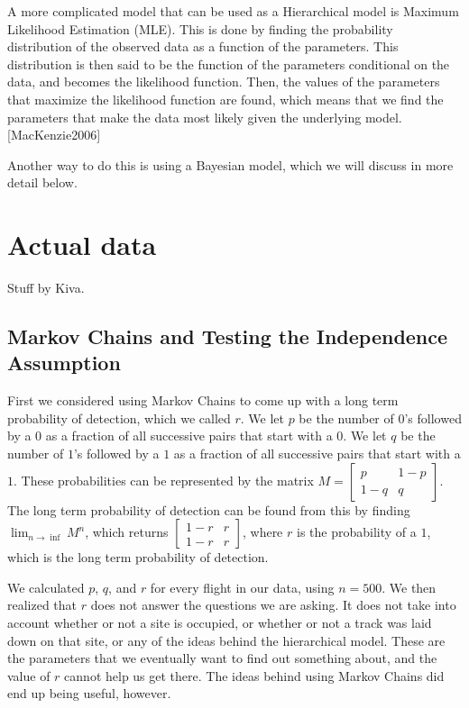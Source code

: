 \documentclass{article}
\begin{document}
	A more complicated model that can be used as a Hierarchical model is Maximum
Likelihood Estimation (MLE).  This is done by finding the probability 
distribution of the observed data as a function of the parameters.  This 
distribution is then said to be the function of the parameters conditional on the
data, and becomes the likelihood function.  Then, the values of the parameters 
that maximize the likelihood function are found, which means that we find the 
parameters that make the data most likely given the underlying model.  
[MacKenzie2006]

	Another way to do this is using a Bayesian model, which we will discuss in 
more detail below.

\section{Actual data}
Stuff by Kiva.

	\subsection{Markov Chains and Testing the Independence Assumption}

		First we considered using Markov Chains to come up with a long term 
probability of detection, which we called \(r\).  We let \(p\) be the number of 
\(0\)'s followed by a \(0\) as a fraction of all successive pairs that start 
with a \(0\).  We let \(q\) be the number of \(1\)'s followed by a \(1\) as a 
fraction of all successive pairs that start with a \(1\).  These probabilities 
can be represented by the matrix \(M = \begin{bmatrix} p & 1-p \\ 1-q & q 
\end{bmatrix}\). The long term probability of detection can be found from this 
by finding \(\lim_{n \to \inf} M^n\), which returns \( \begin{bmatrix} 1-r & r 
\\ 1-r & r\end{bmatrix}\), where \(r\) is the probability of a \(1\), which is 
the long term probability of detection.  

	We calculated \(p\), \(q\), and \(r\) for every flight in our data, using 
\(n = 500\).  We then realized that \(r\) does not answer the questions we are 
asking.  It does not take into account whether or not a site is occupied, or 
whether or not a track was laid down on that site, or any of the ideas behind    
the hierarchical model.  These are the parameters that we eventually want to 
find out something about, and the value of \(r\) cannot help us get there.  The 
ideas behind using Markov Chains did end up being useful, however.  
	
\end{document}
